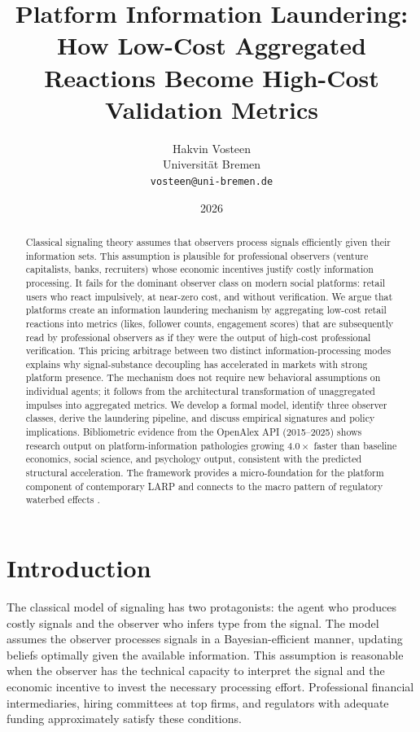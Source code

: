 \documentclass[11pt]{article}
\title{\Large\textbf{Platform Information Laundering:}\\
How Low-Cost Aggregated Reactions Become High-Cost Validation Metrics}
\author{Hakvin Vosteen\\\small Universit\"at Bremen\\\small \texttt{vosteen@uni-bremen.de}}
\date{2026}
\begin{document}
\maketitle

\begin{abstract}
\noindent Classical signaling theory \cite{spence1973} assumes that observers process signals efficiently given their information sets. This assumption is plausible for professional observers (venture capitalists, banks, recruiters) whose economic incentives justify costly information processing. It fails for the dominant observer class on modern social platforms: retail users who react impulsively, at near-zero cost, and without verification. We argue that platforms create an information laundering mechanism by aggregating low-cost retail reactions into metrics (likes, follower counts, engagement scores) that are subsequently read by professional observers as if they were the output of high-cost professional verification. This pricing arbitrage between two distinct information-processing modes explains why signal-substance decoupling has accelerated in markets with strong platform presence. The mechanism does not require new behavioral assumptions on individual agents; it follows from the architectural transformation of unaggregated impulses into aggregated metrics. We develop a formal model, identify three observer classes, derive the laundering pipeline, and discuss empirical signatures and policy implications. Bibliometric evidence from the OpenAlex API (2015--2025) shows research output on platform-information pathologies growing $4.0\times$ faster than baseline economics, social science, and psychology output, consistent with the predicted structural acceleration. The framework provides a micro-foundation for the platform component of contemporary LARP \cite{vosteen2026larp} and connects to the macro pattern of regulatory waterbed effects \cite{vosteen2026waterbed}.
\end{abstract}

\section{Introduction}

The classical \cite{spence1973} model of signaling has two protagonists: the agent who produces costly signals and the observer who infers type from the signal. The model assumes the observer processes signals in a Bayesian-efficient manner, updating beliefs optimally given the available information. This assumption is reasonable when the observer has the technical capacity to interpret the signal and the economic incentive to invest the necessary processing effort. Professional financial intermediaries, hiring committees at top firms, and regulators with adequate funding approximately satisfy these conditions.
\end{document}
